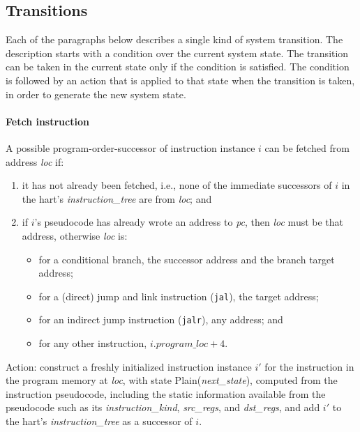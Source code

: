 \subsection{Transitions}\label{sec:omm:transitions}

Each of the paragraphs below describes a single kind of system transition.
The description starts with a condition over the current system state.
The transition can be taken in the current state only if the condition is satisfied.
The condition is followed by an action that is applied to that state when the transition is taken, in order to generate the new system state.

\paragraph{Fetch instruction}\label{omm:fetch}
A possible program-order-successor of instruction instance $i$ can be fetched from address {\it loc} if:
\begin{enumerate}
\item it has not already been fetched, i.e., none of the immediate successors of $i$ in the hart's {\it instruction\_tree} are from {\it loc}; and
\item if $i$'s pseudocode has already wrote an address to {\em pc}, then {\it loc} must be that address, otherwise {\it loc} is:
  \begin{itemize}
  \item for a conditional branch, the successor address and the branch target address;
  \item for a (direct) jump and link instruction ({\tt jal}), the target address;
  \item for an indirect jump instruction ({\tt jalr}), any address; and
  \item for any other instruction, $i.\textit{program\_loc}+4$.
  \end{itemize}
\end{enumerate}

Action: construct a freshly initialized instruction instance $i'$ for the instruction in the program memory at {\it loc}, with state {\sc Plain}({\it next\_state}), computed from the instruction pseudocode, including the static information available from the pseudocode such as its {\it instruction\_kind}, {\it src\_regs}, and {\it dst\_regs}, and add $i'$ to the hart's {\it instruction\_tree} as a successor of $i$.

